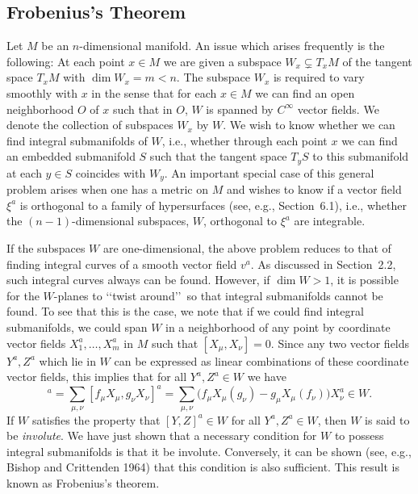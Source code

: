 
\subsection{Frobenius's Theorem}\label{sec:B.3}

Let \(M\) be an \(n\)-dimensional manifold. An issue which arises frequently is the
following: At each point \(x\in M\) we are given a subspace
\(W_x\subsetneq T_xM\) of the tangent space \(T_xM\) with
\(\dim W_x=m<n\). The subspace \(W_x\) is required to vary smoothly with \(x\) in
the sense that for each \(x\in M\) we can find an open neighborhood \(O\) of \(x\)
such that in \(O\), \(W\) is spanned by \(C^\infty\) vector fields. We denote the
collection of subspaces \(W_x\) by \(W\). We wish to know whether we can find
integral submanifolds of \(W\), i.e., whether through each point \(x\) we can find an
embedded submanifold \(S\) such that the tangent space \(T_yS\) to this submanifold
at each \(y\in S\) coincides with \(W_y\). An important special case of this general
problem arises when one has a metric on \(M\) and wishes to know if a vector field
\(\xi^a\) is orthogonal to a family of hypersurfaces (see, e.g., Section~6.1), i.e.,
whether the \((n-1)\)-dimensional subspaces, \(W\), orthogonal to \(\xi^a\) are
integrable.

If the subspaces \(W\) are one-dimensional, the above problem reduces to that of
finding integral curves of a smooth vector field \(v^a\). As discussed in
Section~2.2, such integral curves always can be found. However, if
\(\dim W>1\), it is possible for the \(W\)-planes to \lq\lq twist around\rq\rq\ so
that integral submanifolds cannot be found. To see that this is the case, we note that
if we could find integral submanifolds, we could span \(W\) in a neighborhood of any
point by coordinate vector fields \(X_1^a,\ldots,X_m^a\) in \(M\) such that
\([X_\mu,X_\nu]=0\). Since any two vector fields \(Y^a,Z^a\) which lie in \(W\) can
be expressed as linear combinations of these coordinate vector fields, this implies
that for all \(Y^a,Z^a\in W\) we have
\begin{equation}
  [Y,Z]^a
  =\sum_{\mu,\nu}[f_\mu X_\mu,g_\nu X_\nu]^a
  =\sum_{\mu,\nu}
  \bigl(f_\mu X_\mu(g_\nu)-g_\mu X_\mu(f_\nu)\bigr)X_\nu^a\in W.
  \tag{B.3.1}\label{eq:B.3.1}
\end{equation}
If \(W\) satisfies the property that \([Y,Z]^a\in W\) for all
\(Y^a,Z^a\in W\), then \(W\) is said to be \emph{involute}. We have just shown that
a necessary condition for \(W\) to possess integral submanifolds is that it be
involute. Conversely, it can be shown (see, e.g., Bishop and Crittenden 1964) that
this condition is also sufficient. This result is known as Frobenius's theorem.

